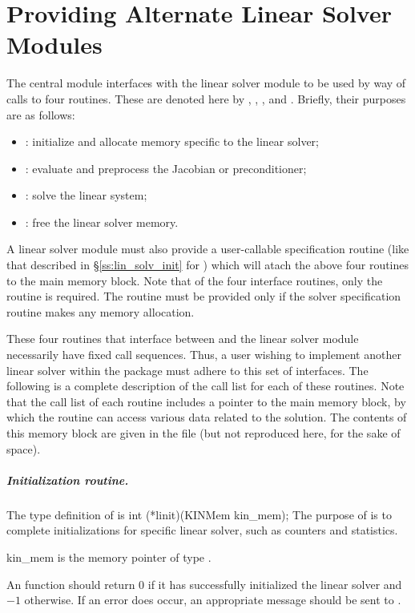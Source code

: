\chapter{Providing Alternate Linear Solver Modules}\label{s:new_linsolv}
The central {\kinsol} module interfaces with the linear solver module to be
used by way of calls to four routines.  These are denoted here by 
, , , and .
Briefly, their purposes are as follows:
\begin{itemize}
\item {}: initialize and allocate memory specific to the
  linear solver;
\item {}: evaluate and preprocess the Jacobian or preconditioner;
\item {}: solve the linear system;
\item {}: free the linear solver memory.
\end{itemize}
A linear solver module must also provide a user-callable specification routine
(like that described in \S\ref{ss:lin_solv_init} for {\kinspgmr}) which will atach 
the above four routines to the main {\kinsol} memory block. 
Note that of the four interface routines, only the  routine is required. 
The  routine must be provided only if the solver specification routine
makes any memory allocation.

These four routines that interface between {\kinsol} and the linear solver module
necessarily have fixed call sequences.  Thus, a user wishing to implement another 
linear solver within the {\kinsol} package must adhere to this set of interfaces.
The following is a complete description of the call list for each of
these routines.  Note that the call list of each routine includes a
pointer to the main {\kinsol} memory block, by which the routine can access
various data related to the {\kinsol} solution.  The contents of this memory
block are given in the file  (but not reproduced here, for
the sake of space).


\paragraph{Initialization routine.}
The type definition of  is
{
  int (*linit)(KINMem kin\_mem);
}
{
  The purpose of  is to complete initializations for      
  specific linear solver, such as counters and statistics.        
}
{
  \begin{args}
  \item[kin\_mem]
    is the {\kinsol} memory pointer of type .
  \end{args}
}
{
  An  function should return $0$ if it 
  has successfully initialized the {\kinsol} linear solver and 
  $-1$ otherwise. 
}
{
  If an error does occur, an appropriate message should be sent 
  to .
}

